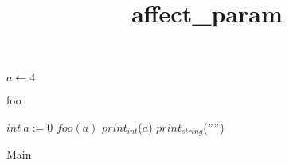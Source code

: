 \documentclass[8pt]{article}
\title{affect\_param}
\begin{document}
\maketitle
\begin{algorithm}[H]

$a \leftarrow 4 $\;
\caption{foo}
\end{algorithm}

\begin{algorithm}[H]
$int\:a := 0$\;
$foo(a)$\;
$print_{int}$($ a $)\;
$print_{string}$($ "
" $)\;
\caption{Main}
\end{algorithm}
\end{document}
